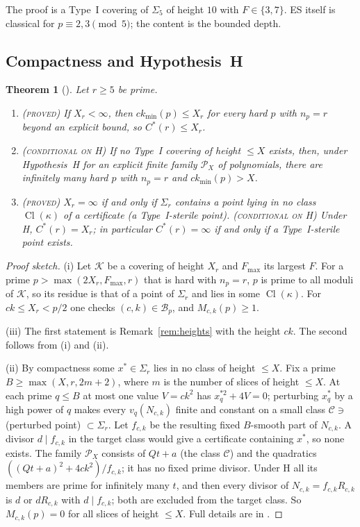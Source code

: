 \documentclass[11pt,reqno]{amsart}
\newtheorem{theorem}{Theorem}[section]
\theoremstyle{definition}
\newcommand{\Cl}{\operatorname{Cl}}
\newcommand{\ckmin}{ck_{\min}}
\newcommand{\status}[1]{\textup{\textsc{#1}}}
\begin{document}
The proof is a Type~I covering of $\Sigma_5$ of height $10$ with
$F\in\{3,7\}$.  ES itself is classical for $p\equiv2,3\pmod 5$; the
content is the bounded depth.

\subsection{Compactness and Hypothesis~H}

\begin{theorem}[{\cite[Thm.~A]{PT2}}]\label{thm:A}
Let $r\ge5$ be prime.
\begin{enumerate}
\item[(i)] \status{(proved)} If $X_r<\infty$, then
$\ckmin(p)\le X_r$ for every hard $p$ with $n_p=r$ beyond an explicit
bound, so $C^*(r)\le X_r$.
\item[(ii)] \status{(conditional on H)} If no Type~I covering of height
$\le X$ exists, then, under Hypothesis~H for an explicit finite family
$\mathcal P_X$ of polynomials, there are infinitely many hard $p$ with
$n_p=r$ and $\ckmin(p)>X$.
\item[(iii)] \status{(proved)} $X_r=\infty$ if and only if $\Sigma_r$
contains a point lying in no class $\Cl(\kappa)$ of a certificate (a
\emph{Type~I-sterile point}).  \status{(conditional on H)} Under H,
$C^*(r)=X_r$; in particular
$C^*(r)=\infty$ if and only if a Type~I-sterile point exists.
\end{enumerate}
\end{theorem}

\begin{proof}[Proof sketch]
(i) Let $\mathcal K$ be a covering of height $X_r$ and $F_{\max}$ its
largest $F$.  For a prime $p>\max(2X_r,F_{\max},r)$ that is hard with
$n_p=r$, $p$ is prime to all moduli of $\mathcal K$, so its residue is that
of a point of $\Sigma_r$ and lies in some $\Cl(\kappa)$.  For $ck\le
X_r<p/2$ one checks $(c,k)\in\mathcal B_p$, and $M_{c,k}(p)\ge1$.

(iii) The first statement is Remark~\ref{rem:heights} with the
height $ck$.  The second follows from (i) and (ii).

(ii) By compactness some $x^*\in\Sigma_r$ lies in no class of height
$\le X$.  Fix a prime $B\ge\max(X,r,2m+2)$, where $m$ is the number of
slices of height $\le X$.  At each prime $q\le B$ at most one value
$V=ck^2$ has $x^{*2}_q+4V=0$; perturbing $x^*_q$ by a high power of $q$
makes every $v_q(N_{c,k})$ finite and constant on a small class
$\mathcal C\ni$ (perturbed point) $\subset\Sigma_r$.  Let $f_{c,k}$ be the
resulting fixed $B$-smooth part of $N_{c,k}$.  A divisor $d\mid f_{c,k}$
in the target class would give a certificate containing $x^*$, so none
exists.  The family $\mathcal P_X$ consists of $Qt+a$ (the class
$\mathcal C$) and the quadratics $((Qt+a)^2+4ck^2)/f_{c,k}$; it has no
fixed prime divisor.  Under H all its members are prime for infinitely
many $t$, and then every divisor of $N_{c,k}=f_{c,k}R_{c,k}$ is $d$ or
$dR_{c,k}$ with $d\mid f_{c,k}$; both are excluded from the target class.
So $M_{c,k}(p)=0$ for all slices of height $\le X$.  Full details are in
\cite[\S1]{PT2}.
\end{proof}
\end{document}
